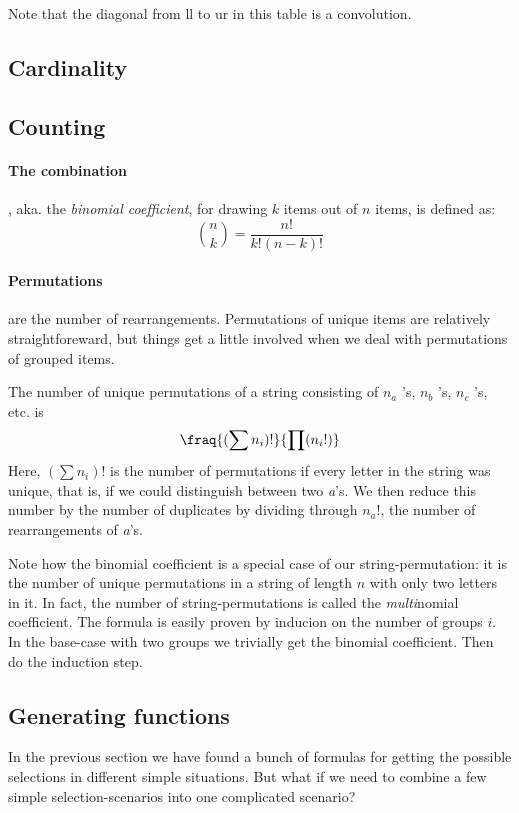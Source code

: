 Note that the diagonal from ll to ur in this table is a convolution. 

\subsection{Cardinality}


\subsection{Counting}

\paragraph{The combination}, aka. the \emph{binomial coefficient}, for drawing $k$ items out of $n$ items,  is defined as: 
$$ \binom{n}{k} = \frac{ n! }{ k!(n-k)! }$$

\paragraph{Permutations} are the number of rearrangements. Permutations of unique items are relatively straightforeward, but things get a little involved when we deal with permutations of grouped items. 

The number of unique permutations of a string consisting of $n_a$ 's, $n_b$ 's, $n_c$ 's, etc. is 
$$ \fraq{( \sum n_i )!}{\prod (n_i !)} $$
Here, $( \sum n_i )! $ is the number of permutations if every letter in the string was unique, that is, if we could distinguish between two \emph{a}'s. We then reduce this number by the number of duplicates by dividing through $n_a !$, the number of rearrangements of \emph{a}'s.

Note how the binomial coefficient is a special case of our string-permutation: it is the number of unique permutations in a string of length $n$ with only two letters in it. 
In fact, the number of string-permutations is called the \emph{multi}nomial coefficient. The formula is easily proven by inducion on the number of groups $i$. In the base-case with two groups we trivially get the binomial coefficient. Then do the induction step. 



\subsection{Generating functions}

In the previous section we have found a bunch of formulas for getting the possible selections in different simple situations. But what if we need to combine a few simple selection-scenarios into one complicated scenario? 

